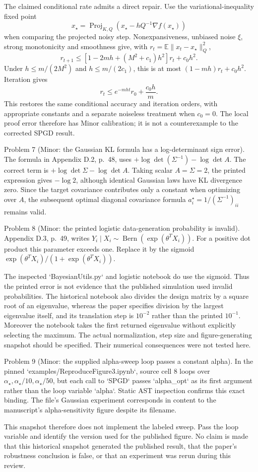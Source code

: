 \documentclass[10pt]{article}
\begin{document}
The claimed conditional rate admits a direct repair. Use the variational-inequality fixed point \[x_\star=\mathop{\mathrm{Proj}}_{K,Q}(x_\star-hQ^{-1}\nabla f(x_\star))\] when comparing the projected noisy step. Nonexpansiveness, unbiased noise \(\xi\), strong monotonicity and smoothness give, with \(r_t=\mathbb E\|x_t-x_\star\|_Q^2\), \[r_{t+1}\leq
 [1-2mh+(M^2+c_1)h^2]r_t+c_0h^2 .\] Under \(h\leq m/(2M^2)\) and \(h\leq m/(2c_1)\), this is at most \((1-mh)r_t+c_0h^2\). Iteration gives \[r_t\leq e^{-mht}r_0+\frac{c_0h}{m}.\] This restores the same conditional accuracy and iteration orders, with appropriate constants and a separate noiseless treatment when \(c_0=0\). The local proof error therefore has Minor calibration; it is not a counterexample to the corrected SPGD result.\par
Problem 7 (Minor: the Gaussian KL formula has a log-determinant sign error).  The formula in Appendix D.2, p. 48, uses \(+\log\det(\Sigma^{-1})-\log\det A\). The correct term is \(+\log\det\Sigma-\log\det A\). Taking scalar \(A=\Sigma=2\), the printed expression gives \(-\log2\), although identical Gaussian laws have KL divergence zero. Since the target covariance contributes only a constant when optimizing over \(A\), the subsequent optimal diagonal covariance formula \(a_i^\star=1/(\Sigma^{-1})_{ii}\) remains valid.\par
Problem 8 (Minor: the printed logistic data-generation probability is invalid).  Appendix D.3, p. 49, writes \(Y_i\mid X_i\sim\operatorname{Bern}(\exp(\theta^TX_i))\). For a positive dot product this parameter exceeds one. Replace it by the sigmoid \(\exp(\theta^TX_i)/(1+\exp(\theta^TX_i))\).\par
The inspected `BayesianUtils.py` and logistic notebook do use the sigmoid. Thus the printed error is not evidence that the published simulation used invalid probabilities. The historical notebook also divides the design matrix by a square root of an eigenvalue, whereas the paper specifies division by the largest eigenvalue itself, and its translation step is \(10^{-2}\) rather than the printed \(10^{-1}\). Moreover the notebook takes the first returned eigenvalue without explicitly selecting the maximum. The actual normalization, step size and figure-generating snapshot should be specified. Their numerical consequences were not tested here.\par
Problem 9 (Minor: the supplied alpha-sweep loop passes a constant alpha).  In the pinned `examples/ReproduceFigure3.ipynb`, source cell 8 loops over \(\alpha_\star,\alpha_\star/10,\alpha_\star/50\), but each call to `SPGD` passes `alpha\_opt` as its first argument rather than the loop variable `alpha`. Static AST inspection confirms this exact binding. The file’s Gaussian experiment corresponds in content to the manuscript’s alpha-sensitivity figure despite its filename.\par
This snapshot therefore does not implement the labeled sweep. Pass the loop variable and identify the version used for the published figure. No claim is made that this historical snapshot generated the published result, that the paper’s robustness conclusion is false, or that an experiment was rerun during this review.\par
\end{document}
